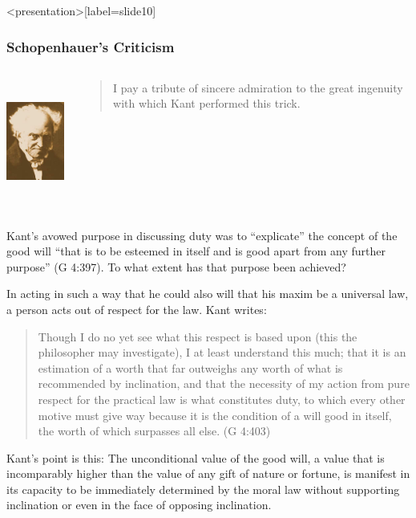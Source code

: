 \begin{frame}<presentation>[label=slide10]
    \frametitle{Schopenhauer's Criticism}
        \begin{columns}
            \begin{column}{3cm}
                \includegraphics[height=4cm]{../../graphics/schopenhauer.jpg}
            \end{column}
            \begin{column}{7cm}
                \begin{quote}
                	I pay a tribute of sincere admiration to the great ingenuity with which Kant performed this trick.
                \end{quote}
            \end{column}
        \end{columns}
\end{frame}

Kant's avowed purpose in discussing duty was to ``explicate'' the concept of the good will ``that is to be esteemed in itself and is good apart from any further purpose'' (G 4:397). To what extent has that purpose been achieved?

In acting in such a way that he could also will that his maxim be a universal law, a person acts out of respect for the law. Kant writes:

\begin{quote}
	Though I do no yet see what this respect is based upon (this the philosopher may investigate), I at least understand this much; that it is an estimation of a worth that far outweighs any worth of what is recommended by inclination, and that the necessity of my action from pure respect for the practical law is what constitutes duty, to which every other motive must give way because it is the condition of a will good in itself, the worth of which surpasses all else. (G 4:403)
\end{quote}

Kant's point is this: The unconditional value of the good will, a value that is incomparably higher than the value of any gift of nature or fortune, is manifest in its capacity to be immediately determined by the moral law without supporting inclination or even in the face of opposing inclination.

